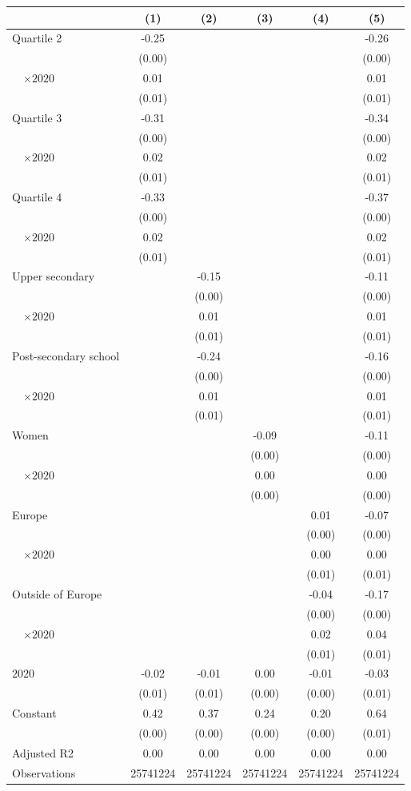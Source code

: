 
\begin{tabular}{@{}l*{5}{S[table-format={-}2.2{\tnote{***}}]}@{}}
\toprule
{} & {(1)} & {(2)} & {(3)} & {(4)} & {(5)}\tabularnewline%
\midrule
Quartile 2 & -0.25\tnote{***} &  &  &  & -0.26\tnote{***}\tabularnewline%
 & (0.00) &  &  &  & \vphantom{2} (0.00)\tabularnewline%
~~\(\times 2020\) & 0.01 &  &  &  & 0.01\tabularnewline%
 & (0.01) &  &  &  & \vphantom{2} (0.01)\tabularnewline%
Quartile 3 & -0.31\tnote{***} &  &  &  & -0.34\tnote{***}\tabularnewline%
 & (0.00) &  &  &  & \vphantom{1} (0.00)\tabularnewline%
~~\(\times 2020\) & 0.02\tnote{*} &  &  &  & 0.02\tnote{**}\tabularnewline%
 & (0.01) &  &  &  & \vphantom{1} (0.01)\tabularnewline%
Quartile 4 & -0.33\tnote{***} &  &  &  & -0.37\tnote{***}\tabularnewline%
 & (0.00) &  &  &  & (0.00)\tabularnewline%
~~\(\times 2020\) & 0.02\tnote{**} &  &  &  & 0.02\tnote{**}\tabularnewline%
 & (0.01) &  &  &  & (0.01)\tabularnewline%
Upper secondary &  & -0.15\tnote{***} &  &  & -0.11\tnote{***}\tabularnewline%
 &  & (0.00) &  &  & \vphantom{1} (0.00)\tabularnewline%
~~\(\times 2020\) &  & 0.01 &  &  & \vphantom{1} 0.01\tabularnewline%
 &  & (0.01) &  &  & \vphantom{1} (0.01)\tabularnewline%
Post-secondary school &  & -0.24\tnote{***} &  &  & -0.16\tnote{***}\tabularnewline%
 &  & (0.00) &  &  & (0.00)\tabularnewline%
~~\(\times 2020\) &  & 0.01 &  &  & 0.01\tabularnewline%
 &  & (0.01) &  &  & (0.01)\tabularnewline%
Women &  &  & -0.09\tnote{***} &  & -0.11\tnote{***}\tabularnewline%
 &  &  & (0.00) &  & \vphantom{1} (0.00)\tabularnewline%
~~\(\times 2020\) &  &  & 0.00 &  & 0.00\tabularnewline%
 &  &  & (0.00) &  & (0.00)\tabularnewline%
Europe &  &  &  & 0.01\tnote{**} & -0.07\tnote{***}\tabularnewline%
 &  &  &  & (0.00) & \vphantom{1} (0.00)\tabularnewline%
~~\(\times 2020\) &  &  &  & 0.00 & 0.00\tabularnewline%
 &  &  &  & (0.01) & \vphantom{1} (0.01)\tabularnewline%
Outside of Europe &  &  &  & -0.04\tnote{***} & -0.17\tnote{***}\tabularnewline%
 &  &  &  & (0.00) & (0.00)\tabularnewline%
~~\(\times 2020\) &  &  &  & 0.02\tnote{***} & 0.04\tnote{***}\tabularnewline%
 &  &  &  & (0.01) & (0.01)\tabularnewline%
\midrule
\(2020\) & -0.02\tnote{**} & -0.01 & 0.00 & -0.01\tnote{***} & -0.03\tnote{*}\tabularnewline%
 & (0.01) & (0.01) & (0.00) & (0.00) & (0.01)\tabularnewline%
Constant & 0.42\tnote{***} & 0.37\tnote{***} & 0.24\tnote{***} & 0.20\tnote{***} & 0.64\tnote{***}\tabularnewline%
 & (0.00) & (0.00) & (0.00) & (0.00) & (0.01)\tabularnewline%
\midrule
Adjusted R2 & 0.00 & 0.00 & 0.00 & 0.00 & 0.00\tabularnewline%
Observations & {\num{25741224}} & {\num{25741224}} & {\num{25741224}} & {\num{25741224}} & {\num{25741224}}\tabularnewline%
\bottomrule
\end{tabular}
